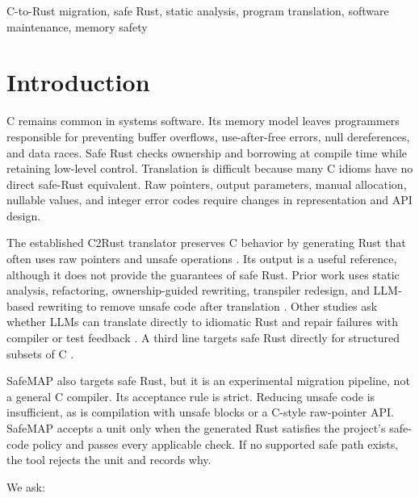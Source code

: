 \documentclass[conference]{IEEEtran}
\newcommand{\tool}{SafeMAP\xspace}
\begin{document}
\begin{IEEEkeywords}
C-to-Rust migration, safe Rust, static analysis, program translation, software
maintenance, memory safety
\end{IEEEkeywords}

\section{Introduction}

C remains common in systems software. Its memory model leaves programmers
responsible for preventing buffer overflows, use-after-free errors, null
dereferences, and data races. Safe Rust checks ownership and borrowing at
compile time while retaining low-level control. Translation is difficult
because many C idioms have no direct safe-Rust equivalent. Raw pointers, output
parameters, manual allocation, nullable values, and integer error codes require
changes in representation and API design.

The established C2Rust translator preserves C behavior by generating Rust that
often uses raw pointers and unsafe operations \cite{c2rust}. Its output is a
useful reference, although it does not provide the guarantees of safe Rust.
Prior work uses static analysis, refactoring, ownership-guided rewriting,
transpiler redesign, and LLM-based rewriting to remove unsafe code after
translation
\cite{ling2022trust,emre2021safer,hong2023static,zhang2023ownership,
nitin2026c2saferrust,mohapatra2026cp2srust,hong2025cacm}. Other studies ask
whether LLMs can translate directly to idiomatic Rust and repair failures with
compiler or test feedback
\cite{hong2025typemigrating,zhou2025c2rusttv,eniser2025fluorine,
valenzuela2026llmcompile,zhang2026rustflow}. A third line
targets safe Rust directly for structured subsets of C \cite{fromherz2026scylla}.

\tool also targets safe Rust, but it is an experimental migration pipeline, not
a general C compiler. Its acceptance rule is strict. Reducing unsafe code is
insufficient, as is compilation with unsafe blocks or a C-style raw-pointer
API. \tool accepts a unit only when the generated Rust satisfies the project's
safe-code policy and passes every applicable check. If no supported safe path
exists, the tool rejects the unit and records why.

We ask:
\end{document}
